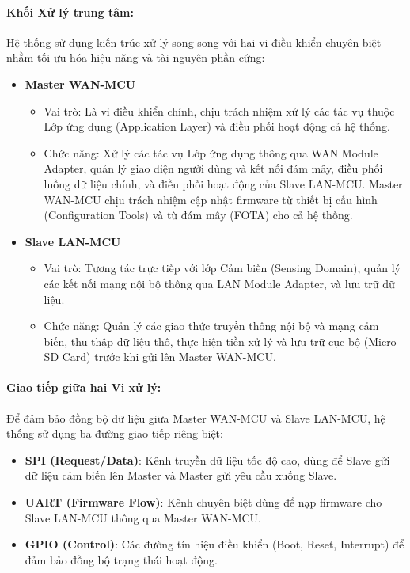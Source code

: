         \paragraph{Khối Xử lý trung tâm:}\par
            Hệ thống sử dụng kiến trúc xử lý song song với hai vi điều khiển chuyên biệt nhằm tối ưu hóa hiệu năng và tài nguyên phần cứng:
            \begin{itemize}
                \item \textbf{Master WAN-MCU}
                \begin{itemize}
                    \item Vai trò: Là vi điều khiển chính, chịu trách nhiệm xử lý các tác vụ thuộc Lớp ứng dụng (Application Layer) và điều phối hoạt động cả hệ thống.
                    \item Chức năng: Xử lý các tác vụ Lớp ứng dụng thông qua WAN Module Adapter, quản lý giao diện người dùng và kết nối đám mây, điều phối luồng dữ liệu chính, và điều phối hoạt động của Slave LAN-MCU. Master WAN-MCU chịu trách nhiệm cập nhật firmware từ thiết bị cấu hình (Configuration Tools) và từ đám mây (FOTA) cho cả hệ thống.
                \end{itemize}
                \item \textbf{Slave LAN-MCU}
                \begin{itemize}
                    \item Vai trò: Tương tác trực tiếp với lớp Cảm biến (Sensing Domain), quản lý các kết nối mạng nội bộ thông qua LAN Module Adapter, và lưu trữ dữ liệu.
                    \item Chức năng: Quản lý các giao thức truyền thông nội bộ và mạng cảm biến, thu thập dữ liệu thô, thực hiện tiền xử lý và lưu trữ cục bộ (Micro SD Card) trước khi gửi lên Master WAN-MCU.
                \end{itemize}
            \end{itemize}

        \paragraph{Giao tiếp giữa hai Vi xử lý:}\par
            Để đảm bảo đồng bộ dữ liệu giữa Master WAN-MCU và Slave LAN-MCU, hệ thống sử dụng ba đường giao tiếp riêng biệt:
            \begin{itemize}
                \item \textbf{SPI (Request/Data)}: Kênh truyền dữ liệu tốc độ cao, dùng để Slave gửi dữ liệu cảm biến lên Master và Master gửi yêu cầu xuống Slave.
                \item \textbf{UART (Firmware Flow)}: Kênh chuyên biệt dùng để nạp firmware cho Slave LAN-MCU thông qua Master WAN-MCU.
                \item \textbf{GPIO (Control)}: Các đường tín hiệu điều khiển (Boot, Reset, Interrupt) để đảm bảo đồng bộ trạng thái hoạt động.
            \end{itemize}

